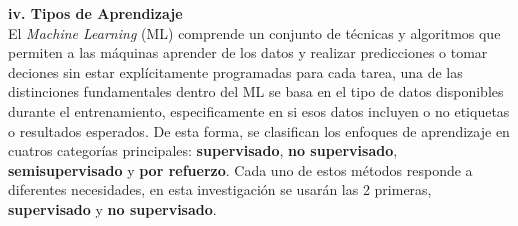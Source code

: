\documentclass[11pt]{article} %
\begin{document}
\vspace{8pt}
\textbf{iv. Tipos de Aprendizaje} \\[3pt]
El \textit{Machine Learning} (ML) comprende un conjunto de técnicas y algoritmos que permiten a las máquinas aprender de los datos y realizar predicciones o tomar deciones sin estar explícitamente programadas para cada tarea, una de las distinciones fundamentales dentro del ML se basa en el tipo de datos disponibles durante el entrenamiento, especificamente en si esos datos incluyen o no etiquetas o resultados esperados. De esta forma, se clasifican los enfoques de aprendizaje en cuatros categorías principales: \textbf{supervisado}, \textbf{no supervisado}, \textbf{semisupervisado} y \textbf{por refuerzo}. Cada uno de estos métodos responde a diferentes necesidades, en esta investigación se usarán las 2 primeras, \textbf{supervisado} y \textbf{no supervisado}.
\end{document}
